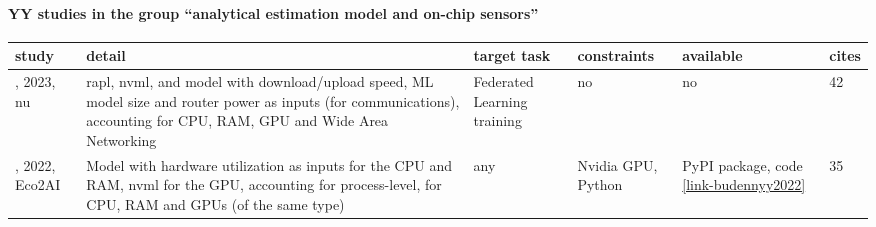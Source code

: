 \paragraph{YY studies in the group ``analytical estimation model and on-chip sensors''} 
 \label{tab:YY-analytical-estimation-model-and-on-chip-sensors} 
\begin{longtable}{|>{\raggedright\arraybackslash}p{2cm}|p{5.9cm}|>{\raggedright\arraybackslash}p{1.85cm}|>{\raggedright\arraybackslash}p{2cm}|>{\raggedright\arraybackslash}p{1.5cm}|p{0.7cm}|}
\toprule
\bfseries study & \bfseries detail & \bfseries target task & \bfseries constraints & \bfseries available & \bfseries cites \\
\midrule 
\endhead
\cite{qiu2023}, 2023, \acrshort{nu} & \acrshort{rapl}, \acrshort{nvml}, and model with download/upload speed, ML model size and router power as inputs (for communications), accounting for CPU, RAM, GPU and Wide Area Networking & Federated Learning training & no & no & 42 \\
\cite{budennyy2022}, 2022, Eco2AI & Model with hardware utilization as inputs for the CPU and RAM, \acrshort{nvml} for the GPU, accounting for process-level, for CPU, RAM and GPUs (of the same type) & any & Nvidia GPU, Python & PyPI package, code \href{https://github.com/sb-ai-lab/Eco2AI }{\ref*{link-budennyy2022}} & 35 \\
\bottomrule
\end{longtable}

